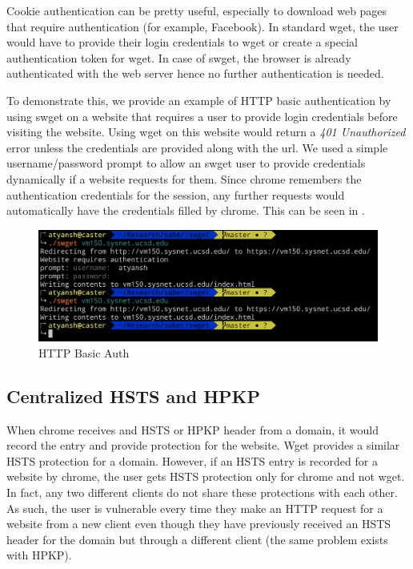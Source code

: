 Cookie authentication can be pretty useful, especially to download web pages
that require authentication (for example, Facebook). In standard wget, the user
would have to provide their login credentials to wget or create a special
authentication token for wget. In case of swget, the browser is already
authenticated with the web server hence no further authentication is needed.

To demonstrate this, we provide an example of HTTP basic authentication by
using swget on a website that requires a user to provide login credentials
before visiting the website. Using wget on this website would return a
\emph{401 Unauthorized} error unless the credentials are provided along with
the url. We used a simple username/password prompt to allow an swget user to
provide credentials dynamically if a website requests for them. Since chrome
remembers the authentication credentials for the session, any further requests
would automatically have the credentials filled by chrome. This can be seen in
.

\begin{figure}[h]
  \includegraphics[width=\textwidth]{figures/basic-auth}
  \caption{HTTP Basic Auth} 
  \label{fig:basic-auth-saber}
\end{figure}

\subsection{Centralized HSTS and HPKP}
When chrome receives and HSTS or HPKP header from a domain, it would record the
entry and provide protection for the website. Wget provides a similar HSTS
protection for a domain. However, if an HSTS entry is recorded for a website by
chrome, the user gets HSTS protection only for chrome and not wget. In fact,
any two different clients do not share these protections with each other. As
such, the user is vulnerable every time they make an HTTP request for a website
from a new client even though they have previously received an HSTS header for
the domain but through a different client (the same problem exists with HPKP).

